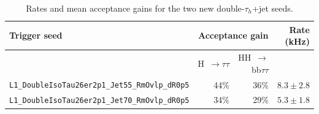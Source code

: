 \documentclass[../main.tex]{subfiles}
\begin{document}
\begin{table}[h!]
\begin{small}
\begin{center}
\begin{tabular}{|l|r|r|r|}
\hline
Trigger seed & \multicolumn{2}{c|}{Acceptance gain} &  Rate (kHz) \\
\hline\hline
& H~$\to\tau\tau$ & HH~$\to$~bb$\tau\tau$ &  \\\hline
\texttt{L1\_DoubleIsoTau26er2p1\_Jet55\_RmOvlp\_dR0p5} & 44$\%$ & 36$\%$& $8.3 \pm 2.8$ \\
\texttt{L1\_DoubleIsoTau26er2p1\_Jet70\_RmOvlp\_dR0p5} & 34$\%$ & 29$\%$ & $5.3 \pm 1.8$ \\\hline
\end{tabular}
\end{center}
\end{small}

\caption[Rates and mean acceptance gains for the two new double-$\tau_h$+jet seeds]{Rates and mean acceptance gains for the two new double-$\tau_h$+jet seeds.}
\label{hh:tab:l1trig:allseeds}
\end{table}

\end{document}
